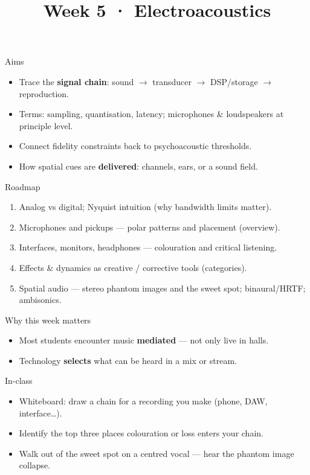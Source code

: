 \documentclass[aspectratio=169]{beamer}
\title{Week 5 · Electroacoustics}
\subtitle{\coursename}
\institute{\instituteuo}
\date{}
\begin{document}
\begin{frame}
  \titlepage
\end{frame}

\begin{frame}{Aims}
  \begin{itemize}
    \item Trace the \textbf{signal chain}: sound $\rightarrow$ transducer $\rightarrow$ DSP/storage $\rightarrow$ reproduction.
    \item Terms: sampling, quantisation, latency; microphones \& loudspeakers at principle level.
    \item Connect fidelity constraints back to psychoacoustic thresholds.
    \item How spatial cues are \textbf{delivered}: channels, ears, or a sound field.
  \end{itemize}
\end{frame}

\begin{frame}{Roadmap}
  \begin{enumerate}
    \item Analog vs digital; Nyquist intuition (why bandwidth limits matter).
    \item Microphones and pickups — polar patterns and placement (overview).
    \item Interfaces, monitors, headphones — colouration and critical listening.
    \item Effects \& dynamics as creative / corrective tools (categories).
    \item Spatial audio — stereo phantom images and the sweet spot; binaural/HRTF; ambisonics.
  \end{enumerate}
\end{frame}

\begin{frame}{Why this week matters}
  \begin{itemize}
    \item Most students encounter music \textbf{mediated} — not only live in halls.
    \item Technology \textbf{selects} what can be heard in a mix or stream.
  \end{itemize}
\end{frame}

\begin{frame}{In-class}
  \begin{itemize}
    \item Whiteboard: draw a chain for a recording you make (phone, DAW, interface\ldots).
    \item Identify the top three places colouration or loss enters your chain.
    \item Walk out of the sweet spot on a centred vocal — hear the phantom image collapse.
  \end{itemize}
\end{frame}
\end{document}
